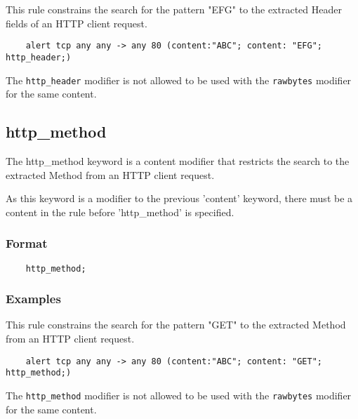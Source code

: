 \documentclass[english]{report}
\newenvironment{note}{
\samepage
    \vspace{10pt}{\textsf{
        {\hspace{7pt}\Huge{$\triangle$\hspace{-12.5pt}{\Large{$^!$}}}}\hspace{5pt}
        {\Large{NOTE}}
    }
    }
   \begin{center}
    \par\vspace{-17pt}

    \begin{lrbox}{\savepar}
    \begin{minipage}[r]{6in}
}
{
    \end{minipage}
    \end{lrbox}
    \fbox{
        \usebox{
            \savepar
	}
    }
    \par\vskip10pt
    \end{center}
}
\newenvironment{note}{
        \begin{rawhtml}
        <p><table border="1"><tr><td><b>
        Note:&nbsp;&nbsp;</b>
        \end{rawhtml}
}{
        \begin{rawhtml}
        </b></td></tr></table></p>
        \end{rawhtml}
}
\begin{document}
This rule constrains the search for the pattern "EFG" to the extracted Header
fields of an HTTP client request.

\begin{verbatim}
    alert tcp any any -> any 80 (content:"ABC"; content: "EFG"; http_header;)
\end{verbatim}

\begin{note}

The \texttt{http\_header} modifier is not allowed to be used with the
\texttt{rawbytes} modifier for the same content.

\end{note}

\subsection{http\_method}
\label{sub:HttpMethod}

The http\_method keyword is a content modifier that restricts the search to the
extracted Method from an HTTP client request.

As this keyword is a modifier to the previous 'content' keyword, there must be
a content in the rule before 'http\_method' is specified.

\subsubsection{Format}

\begin{verbatim}
    http_method;
\end{verbatim}

\subsubsection{Examples}

This rule constrains the search for the pattern "GET" to the extracted Method
from an HTTP client request.

\begin{verbatim}
    alert tcp any any -> any 80 (content:"ABC"; content: "GET"; http_method;)
\end{verbatim}

\begin{note}

The \texttt{http\_method} modifier is not allowed to be used with the
\texttt{rawbytes} modifier for the same content.

\end{note}
\end{document}
